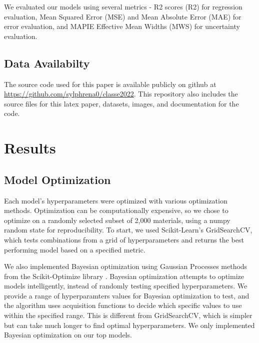 \documentclass[twocolumn, nofootinbib, secnumarabic, amssymb, nobibnotes, aps, prd]{revtex4-2}
\begin{document}
We evaluated our models using several metrics - R2 scores (R2) for regression evaluation, Mean Squared Error (MSE) and Mean Absolute Error (MAE) for error evaluation, and MAPIE Effective Mean Widths (MWS) for uncertainty evaluation.

\subsection{Data Availabilty}
The source code used for this paper is available publicly on github at \url{https://github.com/sylphrena0/classe2022}. This repository also includes the source files for this latex paper, datasets, images, and documentation for the code.

\section{Results}
\subsection{Model Optimization}
Each model's hyperparameters were optimized with various optimization methods. Optimization can be computationally expensive, so we chose to optimize on a randomly selected subset of 2,000 materials, using a numpy random state for reproducibility. To start, we used Scikit-Learn's GridSearchCV, which tests combinations from a grid of hyperparameters and returns the best performing model based on a specified metric. 

We also implemented Bayesian optimization using Gaussian Processes methods from the Scikit-Optimize library \cite{head_tim_2021_5565057}. Bayesian optimization attempts to optimize models intelligently, instead of randomly testing specified hyperparameters. We provide a range of hyperparamters values for Bayesian optimization to test, and the algorithm uses acquisition functions to decide which specific values to use within the specified range. This is different from GridSearchCV, which is simpler but can take much longer to find optimal hyperparameters. We only implemented Bayesian optimization on our top models.
\end{document}
